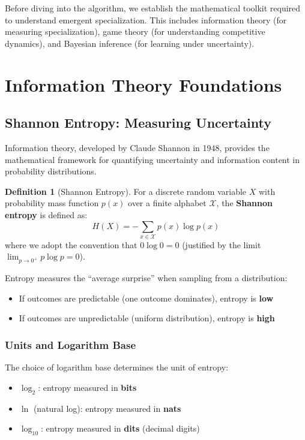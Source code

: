 \documentclass[11pt,a4paper]{article}
\theoremstyle{definition}
\newtheorem{definition}{Definition}[section]
\theoremstyle{plain}
\begin{document}
Before diving into the algorithm, we establish the mathematical toolkit required to understand emergent specialization. This includes information theory (for measuring specialization), game theory (for understanding competitive dynamics), and Bayesian inference (for learning under uncertainty).

\section{Information Theory Foundations}

\subsection{Shannon Entropy: Measuring Uncertainty}

Information theory, developed by Claude Shannon in 1948, provides the mathematical framework for quantifying uncertainty and information content in probability distributions.

\begin{definition}[Shannon Entropy]
For a discrete random variable $X$ with probability mass function $p(x)$ over a finite alphabet $\mathcal{X}$, the \textbf{Shannon entropy} is defined as:
\begin{equation}
H(X) = -\sum_{x \in \mathcal{X}} p(x) \log p(x)
\end{equation}
where we adopt the convention that $0 \log 0 = 0$ (justified by the limit $\lim_{p \to 0^+} p \log p = 0$).
\end{definition}

\begin{intuition}
Entropy measures the ``average surprise'' when sampling from a distribution:
\begin{itemize}
    \item If outcomes are predictable (one outcome dominates), entropy is \textbf{low}
    \item If outcomes are unpredictable (uniform distribution), entropy is \textbf{high}
\end{itemize}
\end{intuition}

\subsubsection{Units and Logarithm Base}

The choice of logarithm base determines the unit of entropy:
\begin{itemize}
    \item $\log_2$: entropy measured in \textbf{bits}
    \item $\ln$ (natural log): entropy measured in \textbf{nats}
    \item $\log_{10}$: entropy measured in \textbf{dits} (decimal digits)
\end{itemize}
\end{document}
